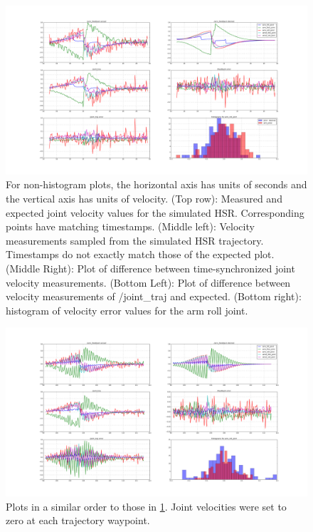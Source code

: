 \documentclass[12pt]{article}
\begin{document}
        \begin{figure}
            \includegraphics[width=\linewidth]{2020.04.03/t8/figure_1_first_100_points_20_bins_trial6.png}
            \centering
            \caption{For non-histogram plots, the horizontal axis has units of seconds and the vertical axis has units of velocity. (Top row): Measured and expected joint velocity values for the simulated HSR. Corresponding points have matching timestamps. (Middle left): Velocity measurements sampled from the simulated HSR trajectory. Timestamps do not exactly match those of the expected plot. (Middle Right): Plot of difference between time-synchronized joint velocity measurements. (Bottom Left): Plot of difference between velocity measurements of /joint\_traj and expected. (Bottom right): histogram of velocity error values for the arm roll joint.}
            \label{fig:velocityAccuracy}
        \end{figure}
        \begin{figure}[ht]
            \includegraphics[width=\linewidth]{2020.04.07/arm_vel_goals_set_to_zero.png}
            \centering
            \caption{Plots in a similar order to those in \cref{fig:velocityAccuracy}. Joint velocities were set to zero at each trajectory waypoint.}
            \label{fig:velocityZero}
        \end{figure}
\end{document}
